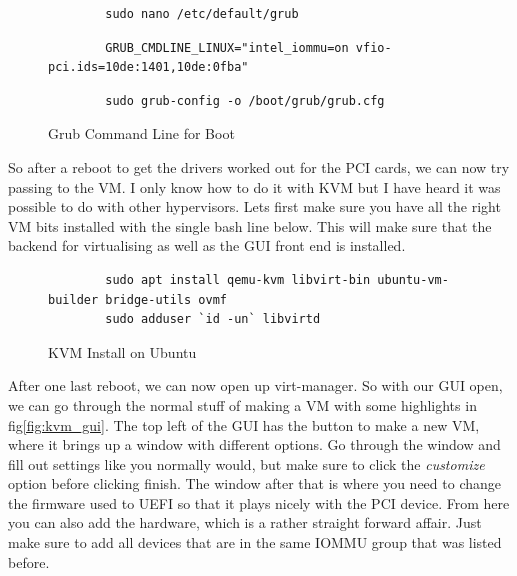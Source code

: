 \documentclass[12pt]{article}
\begin{document}
\vspace{-10pt}
\begin{figure}[ht]
	\centering
	\begin{verbatim}
		sudo nano /etc/default/grub
	\end{verbatim}
	\vspace{-20pt}
	\begin{verbatim}
		GRUB_CMDLINE_LINUX="intel_iommu=on vfio-pci.ids=10de:1401,10de:0fba"
	\end{verbatim}
	\vspace{-20pt}
	\begin{verbatim}
		sudo grub-config -o /boot/grub/grub.cfg
	\end{verbatim}
	\vspace{-20pt}
	\caption{Grub Command Line for Boot}
	\label{fig:grub_cmdline}
\end{figure}

\vspace{-10pt}
So after a reboot to get the drivers worked out for the PCI cards, we can now try passing to the VM.
I only know how to do it with KVM but I have heard it was possible to do with other hypervisors.
Lets first make sure you have all the right VM bits installed with the single bash line below.
This will make sure that the backend for virtualising as well as the GUI front end is installed.

\begin{figure}[ht]
	\centering
	\begin{verbatim}
		sudo apt install qemu-kvm libvirt-bin ubuntu-vm-builder bridge-utils ovmf
		sudo adduser `id -un` libvirtd
	\end{verbatim}
	\vspace{-20pt}
	\caption{KVM Install on Ubuntu \cite{wiki_ubuntu_kvm}}
	\label{fig:ubuntu_kvm_install}
\end{figure}

\vspace{-15pt}
After one last reboot, we can now open up virt-manager.
So with our GUI open, we can go through the normal stuff of making a VM with some highlights in fig\ref{fig:kvm_gui}.
The top left of the GUI has the button to make a new VM, where it brings up a window with different options.
Go through the window and fill out settings like you normally would, but make sure to click the \textit{customize} option before clicking finish.
The window after that is where you need to change the firmware used to UEFI so that it plays nicely with the PCI device.
From here you can also add the hardware, which is a rather straight forward affair.
Just make sure to add all devices that are in the same IOMMU group that was listed before.
\end{document}
